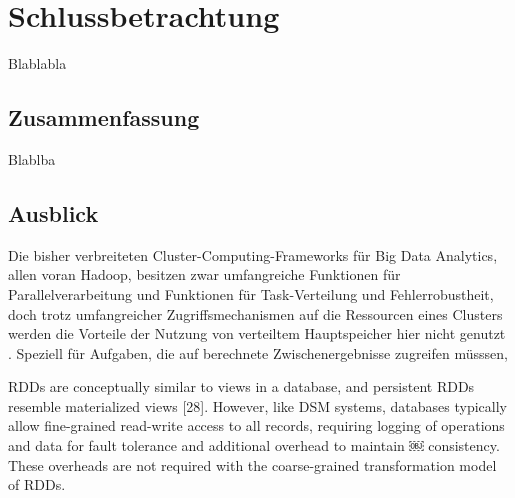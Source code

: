 \chapter{Schlussbetrachtung }
\label{chapter:schlussbetrachtung}


Blablabla 


\section{Zusammenfassung}
\label{section:zusammenfassung}

Blablba

\section{Ausblick}
\label{section:ausblick}

Die bisher verbreiteten Cluster-Computing-Frameworks für Big Data Analytics, allen voran Hadoop, besitzen zwar umfangreiche Funktionen für Parallelverarbeitung und Funktionen für Task-Verteilung und Fehlerrobustheit, doch trotz umfangreicher Zugriffsmechanismen auf die Ressourcen eines Clusters werden die Vorteile der Nutzung von verteiltem Hauptspeicher hier nicht genutzt . Speziell für Aufgaben, die auf berechnete Zwischenergebnisse zugreifen müsssen, 


RDDs are conceptually similar to views in a database, and persistent RDDs resemble materialized views [28]. However, like DSM systems, databases typically allow fine-grained read-write access to all records, requiring logging of operations and data for fault tolerance and additional overhead to maintain
￼
consistency. These overheads are not required with the coarse-grained transformation model of RDDs.

